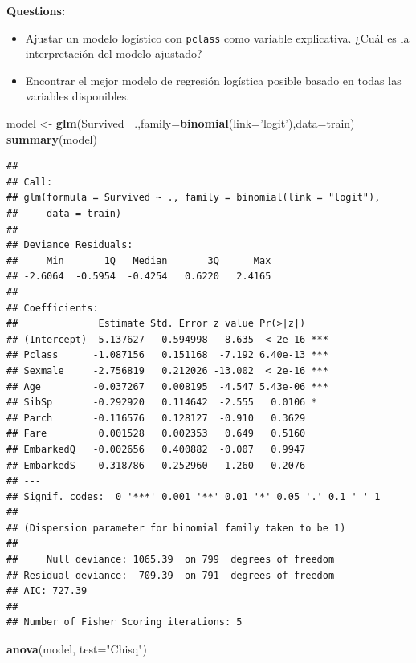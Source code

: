 \documentclass[]{book}
\newenvironment{Shaded}{\begin{snugshade}}{\end{snugshade}}
\newcommand{\KeywordTok}[1]{\textcolor[rgb]{0.13,0.29,0.53}{\textbf{#1}}}
\newcommand{\DataTypeTok}[1]{\textcolor[rgb]{0.13,0.29,0.53}{#1}}
\newcommand{\StringTok}[1]{\textcolor[rgb]{0.31,0.60,0.02}{#1}}
\newcommand{\OperatorTok}[1]{\textcolor[rgb]{0.81,0.36,0.00}{\textbf{#1}}}
\newcommand{\NormalTok}[1]{#1}
\begin{document}
\textbf{Questions:}

\begin{itemize}
\item
  Ajustar un modelo logístico con \texttt{pclass} como variable
  explicativa. ¿Cuál es la interpretación del modelo ajustado?
\item
  Encontrar el mejor modelo de regresión logística posible basado en
  todas las variables disponibles.
\end{itemize}

\begin{Shaded}
\begin{Highlighting}[]
\NormalTok{model <-}\StringTok{ }\KeywordTok{glm}\NormalTok{(Survived }\OperatorTok{~}\NormalTok{.,}\DataTypeTok{family=}\KeywordTok{binomial}\NormalTok{(}\DataTypeTok{link=}\StringTok{'logit'}\NormalTok{),}\DataTypeTok{data=}\NormalTok{train)}
\KeywordTok{summary}\NormalTok{(model)}
\end{Highlighting}
\end{Shaded}

\begin{verbatim}
## 
## Call:
## glm(formula = Survived ~ ., family = binomial(link = "logit"), 
##     data = train)
## 
## Deviance Residuals: 
##     Min       1Q   Median       3Q      Max  
## -2.6064  -0.5954  -0.4254   0.6220   2.4165  
## 
## Coefficients:
##              Estimate Std. Error z value Pr(>|z|)    
## (Intercept)  5.137627   0.594998   8.635  < 2e-16 ***
## Pclass      -1.087156   0.151168  -7.192 6.40e-13 ***
## Sexmale     -2.756819   0.212026 -13.002  < 2e-16 ***
## Age         -0.037267   0.008195  -4.547 5.43e-06 ***
## SibSp       -0.292920   0.114642  -2.555   0.0106 *  
## Parch       -0.116576   0.128127  -0.910   0.3629    
## Fare         0.001528   0.002353   0.649   0.5160    
## EmbarkedQ   -0.002656   0.400882  -0.007   0.9947    
## EmbarkedS   -0.318786   0.252960  -1.260   0.2076    
## ---
## Signif. codes:  0 '***' 0.001 '**' 0.01 '*' 0.05 '.' 0.1 ' ' 1
## 
## (Dispersion parameter for binomial family taken to be 1)
## 
##     Null deviance: 1065.39  on 799  degrees of freedom
## Residual deviance:  709.39  on 791  degrees of freedom
## AIC: 727.39
## 
## Number of Fisher Scoring iterations: 5
\end{verbatim}

\begin{Shaded}
\begin{Highlighting}[]
\KeywordTok{anova}\NormalTok{(model, }\DataTypeTok{test=}\StringTok{"Chisq"}\NormalTok{)}
\end{Highlighting}
\end{Shaded}
\end{document}
